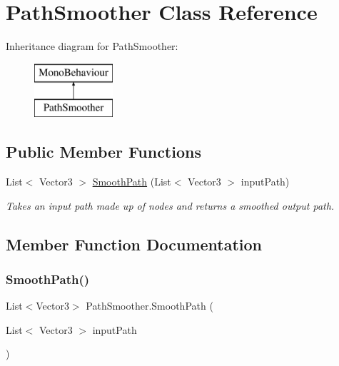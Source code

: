 \hypertarget{class_path_smoother}{}\section{Path\+Smoother Class Reference}
\label{class_path_smoother}
Inheritance diagram for Path\+Smoother\+:\begin{figure}[H]
\begin{center}
\leavevmode
\includegraphics[height=2.000000cm]{class_path_smoother}
\end{center}
\end{figure}
\subsection*{Public Member Functions}
\begin{DoxyCompactItemize}
\item 
List$<$ Vector3 $>$ \mbox{\hyperlink{class_path_smoother_a415277dfe81500b7a69f3a28a6af24b9}{Smooth\+Path}} (List$<$ Vector3 $>$ input\+Path)
\begin{DoxyCompactList}\small\item\em Takes an input path made up of nodes and returns a smoothed output path. \end{DoxyCompactList}\end{DoxyCompactItemize}


\subsection{Member Function Documentation}
\mbox{\label{class_path_smoother_a415277dfe81500b7a69f3a28a6af24b9}} 
\subsubsection{\texorpdfstring{Smooth\+Path()}{SmoothPath()}}
{\footnotesize\ttfamily List$<$Vector3$>$ Path\+Smoother.\+Smooth\+Path (\begin{DoxyParamCaption}\item[{List$<$ Vector3 $>$}]{input\+Path }\end{DoxyParamCaption})}



